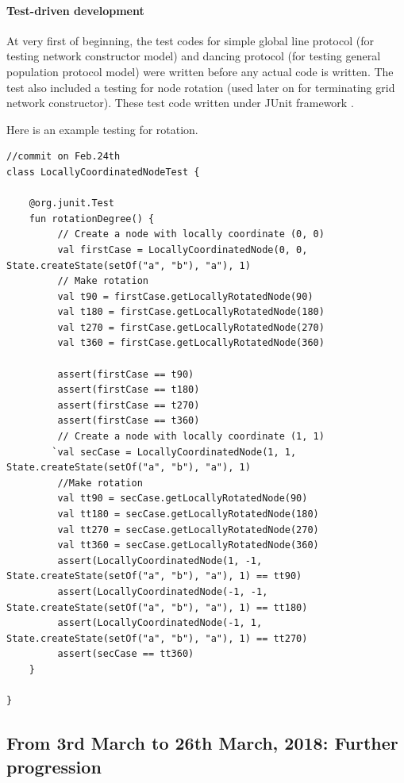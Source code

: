 \paragraph{Test-driven development}
At very first of beginning, the test codes for simple global line protocol (for testing network constructor model)
and dancing protocol (for testing general population protocol model) were written before any actual code is written. The test also included
a testing for node rotation (used later on for terminating grid network constructor). These test code written under JUnit framework \cite{JUnit}.

\par\noindent
Here is an example testing for rotation.
\begin{lstlisting}[caption = {Testing for rotation}, style = mykotlin]
//commit on Feb.24th
class LocallyCoordinatedNodeTest {

    @org.junit.Test
    fun rotationDegree() {
         // Create a node with locally coordinate (0, 0)
         val firstCase = LocallyCoordinatedNode(0, 0, State.createState(setOf("a", "b"), "a"), 1)
         // Make rotation
         val t90 = firstCase.getLocallyRotatedNode(90)
         val t180 = firstCase.getLocallyRotatedNode(180)
         val t270 = firstCase.getLocallyRotatedNode(270)
         val t360 = firstCase.getLocallyRotatedNode(360)

         assert(firstCase == t90)
         assert(firstCase == t180)
         assert(firstCase == t270)
         assert(firstCase == t360)
         // Create a node with locally coordinate (1, 1)
        `val secCase = LocallyCoordinatedNode(1, 1, State.createState(setOf("a", "b"), "a"), 1)
         //Make rotation
         val tt90 = secCase.getLocallyRotatedNode(90)
         val tt180 = secCase.getLocallyRotatedNode(180)
         val tt270 = secCase.getLocallyRotatedNode(270)
         val tt360 = secCase.getLocallyRotatedNode(360)
         assert(LocallyCoordinatedNode(1, -1, State.createState(setOf("a", "b"), "a"), 1) == tt90)
         assert(LocallyCoordinatedNode(-1, -1, State.createState(setOf("a", "b"), "a"), 1) == tt180)
         assert(LocallyCoordinatedNode(-1, 1, State.createState(setOf("a", "b"), "a"), 1) == tt270)
         assert(secCase == tt360)
    }

}
\end{lstlisting}

\subsection{From 3rd March to 26th March, 2018: Further progression}
